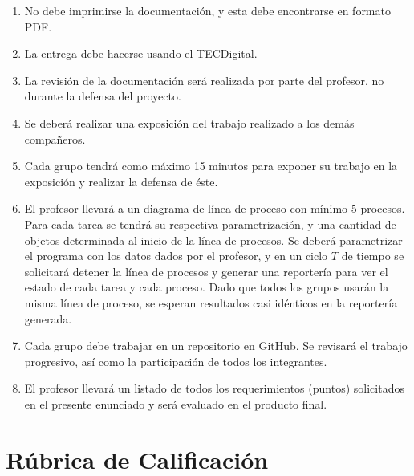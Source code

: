 \documentclass[12pt,letterpaper]{article}
\begin{document}
\begin{enumerate}
    \item No debe imprimirse la documentación, y esta debe encontrarse en formato PDF.
    \item La entrega debe hacerse usando el TECDigital.
    \item La revisión de la documentación será realizada por parte del profesor, no durante la defensa del proyecto.
    \item Se deberá realizar una exposición del trabajo realizado a los demás compañeros.
    \item Cada grupo tendrá como máximo 15 minutos para exponer su trabajo en la exposición y realizar la defensa de éste.
    \item El profesor llevará a un diagrama de línea de proceso con mínimo 5 procesos. Para cada tarea se tendrá su respectiva parametrización, y una cantidad de objetos determinada al inicio de la línea de procesos. Se deberá parametrizar el programa con los datos dados por el profesor, y en un ciclo $T$ de tiempo se solicitará detener la línea de procesos y generar una reportería para ver el estado de cada tarea y cada proceso. Dado que todos los grupos usarán la misma línea de proceso, se esperan resultados casi idénticos en la reportería generada.
    \item Cada grupo debe trabajar en un repositorio en GitHub. Se revisará el trabajo progresivo, así como la participación de todos los integrantes.
    \item El profesor llevará un listado de todos los requerimientos (puntos) solicitados en el presente enunciado y será evaluado en el producto final.
\end{enumerate}

\newpage
\section*{Rúbrica de Calificación}
\end{document}
